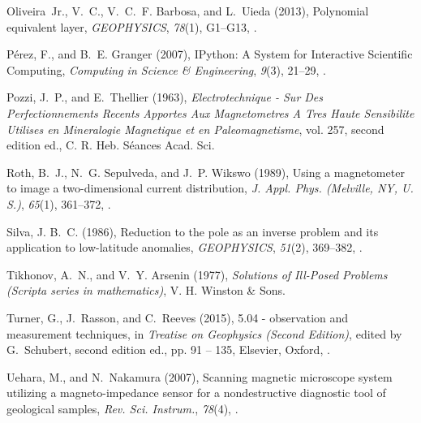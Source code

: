\documentclass[draft,gc]{agutex}
\begin{document}
\begin{article}
\begin{thebibliography}{56}
Oliveira~Jr., V.~C., V.~C.~F. Barbosa, and L.~Uieda (2013), Polynomial
  equivalent layer, \textit{GEOPHYSICS}, \textit{78}(1), G1--G13,
  .

{P{\'e}rez}, F., and B.~E. {Granger} (2007), {{IPython}}: {{A System}} for
  {{Interactive Scientific Computing}}, \textit{Computing in Science \&
  Engineering}, \textit{9}(3), 21--29, .

Pozzi, J.~P., and E.~Thellier (1963), \textit{Electrotechnique - Sur Des
  Perfectionnements Recents Apportes Aux Magnetometres A Tres Haute Sensibilite
  Utilises en Mineralogie Magnetique et en Paleomagnetisme}, vol. 257, second
  edition ed., C. R. Heb. S\'{e}ances Acad. Sci.

Roth, B.~J., N.~G. Sepulveda, and J.~P. Wikswo (1989), Using a magnetometer to
  image a two-dimensional current distribution, \textit{J. Appl. Phys.
  (Melville, NY, U. S.)}, \textit{65}(1), 361--372, .

Silva, J. B.~C. (1986), Reduction to the pole as an inverse problem and its
  application to low-latitude anomalies, \textit{GEOPHYSICS}, \textit{51}(2),
  369--382, .

Tikhonov, A.~N., and V.~Y. Arsenin (1977), \textit{Solutions of Ill-Posed
  Problems (Scripta series in mathematics)}, V. H. Winston \& Sons.

Turner, G., J.~Rasson, and C.~Reeves (2015), 5.04 - observation and measurement
  techniques, in \textit{Treatise on Geophysics (Second Edition)}, edited by
  G.~Schubert, second edition ed., pp. 91 -- 135, Elsevier, Oxford,
  .

Uehara, M., and N.~Nakamura (2007), Scanning magnetic microscope system
  utilizing a magneto-impedance sensor for a nondestructive diagnostic tool of
  geological samples, \textit{Rev. Sci. Instrum.}, \textit{78}(4),
  .


\end{thebibliography}
\end{article}
\end{document}
